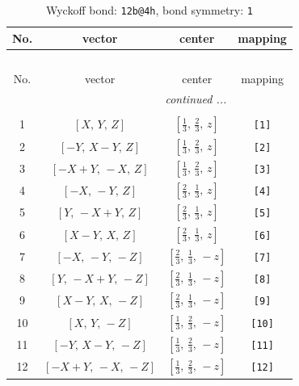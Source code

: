 \documentclass[fleqn,8pt]{jsarticle}
\begin{document}
\begin{longtable}{cccc}
\caption{Wyckoff bond: {\tt 12b@4h}, bond symmetry: {\tt 1}}
 \\
 \hline \hline
No. & vector & center & mapping \\ \hline \endfirsthead

\multicolumn{3}{l}{\tablename\ \thetable{}} \\
 \hline \hline
No. & vector & center & mapping \\ \hline \endhead

 \hline \hline
\multicolumn{3}{r}{\footnotesize\it continued ...} \\ \endfoot

 \hline \hline
\multicolumn{3}{r}{} \\ \endlastfoot

1 & $\left[ X,\, Y,\, Z \right]$ & $\left[ \frac{1}{3},\, \frac{2}{3},\, z \right]$ & {\tt [1]} \\ \hline
2 & $\left[ - Y,\, X - Y,\, Z \right]$ & $\left[ \frac{1}{3},\, \frac{2}{3},\, z \right]$ & {\tt [2]} \\ \hline
3 & $\left[ - X + Y,\, - X,\, Z \right]$ & $\left[ \frac{1}{3},\, \frac{2}{3},\, z \right]$ & {\tt [3]} \\ \hline
4 & $\left[ - X,\, - Y,\, Z \right]$ & $\left[ \frac{2}{3},\, \frac{1}{3},\, z \right]$ & {\tt [4]} \\ \hline
5 & $\left[ Y,\, - X + Y,\, Z \right]$ & $\left[ \frac{2}{3},\, \frac{1}{3},\, z \right]$ & {\tt [5]} \\ \hline
6 & $\left[ X - Y,\, X,\, Z \right]$ & $\left[ \frac{2}{3},\, \frac{1}{3},\, z \right]$ & {\tt [6]} \\ \hline
7 & $\left[ - X,\, - Y,\, - Z \right]$ & $\left[ \frac{2}{3},\, \frac{1}{3},\, - z \right]$ & {\tt [7]} \\ \hline
8 & $\left[ Y,\, - X + Y,\, - Z \right]$ & $\left[ \frac{2}{3},\, \frac{1}{3},\, - z \right]$ & {\tt [8]} \\ \hline
9 & $\left[ X - Y,\, X,\, - Z \right]$ & $\left[ \frac{2}{3},\, \frac{1}{3},\, - z \right]$ & {\tt [9]} \\ \hline
10 & $\left[ X,\, Y,\, - Z \right]$ & $\left[ \frac{1}{3},\, \frac{2}{3},\, - z \right]$ & {\tt [10]} \\ \hline
11 & $\left[ - Y,\, X - Y,\, - Z \right]$ & $\left[ \frac{1}{3},\, \frac{2}{3},\, - z \right]$ & {\tt [11]} \\ \hline
12 & $\left[ - X + Y,\, - X,\, - Z \right]$ & $\left[ \frac{1}{3},\, \frac{2}{3},\, - z \right]$ & {\tt [12]} \\
\end{longtable}
\end{document}
